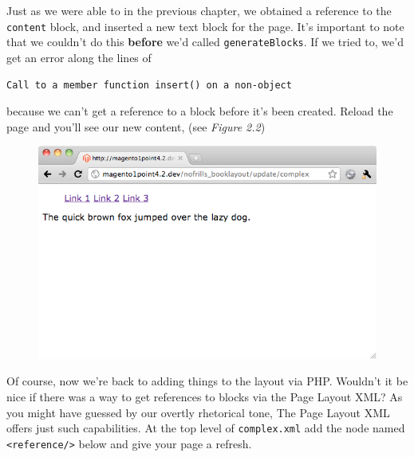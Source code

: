 \documentclass[oneside]{book}
\begin{document}
Just as we were able to in the previous chapter, we obtained a reference to the \footnotesize\texttt{content} \normalsize  block, and inserted a new text block for the page.  It's important to note that we couldn't do this \textbf{before} we'd called  \footnotesize\texttt{generateBlocks}\normalsize. If we tried to, we'd get an error along the lines of

\begin{lstlisting}
Call to a member function insert() on a non-object

\end{lstlisting}


because we can't get a reference to a block before it's been created.  Reload the page and you'll see our new content, (see \emph{Figure 2.2})

\begin{figure}[htb]
\begin{center}
\leavevmode
\includegraphics[width=1\textwidth]{images/chapter2/with-content.png}
\end{center}
\caption{}
\end{figure}


Of course, now we're back to adding things to the layout via PHP.  Wouldn't it be nice if there was a way to get references to blocks via the Page Layout XML? As you might have guessed by our overtly rhetorical tone, The Page Layout XML offers just such capabilities.  At the top level of \footnotesize\texttt{complex.xml} \normalsize  add the node named \footnotesize\texttt{\textless reference/\textgreater } \normalsize  below and give your page a refresh.
\end{document}
